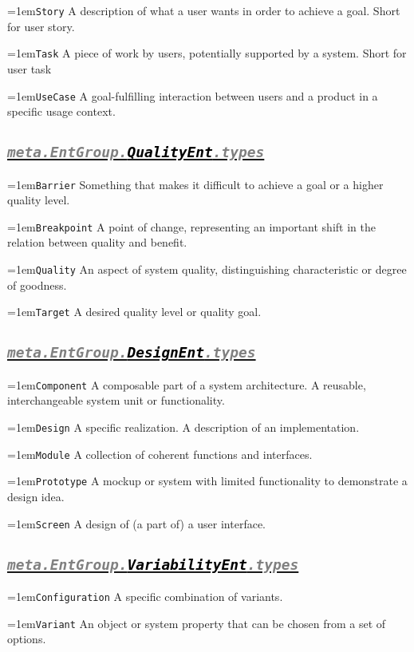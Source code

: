 \documentclass[a4paper,oneside]{article}
\newcommand\Concept[2]{\hangindent=1em\lstinline+#1+ #2}
\begin{document}
\begin{multicols*}{4}
\Concept{Story}{A description of what a user wants in order to achieve a goal. Short for user story.}

\Concept{Task}{A piece of work by users, potentially supported by a system. Short for user task}

\Concept{UseCase}{A goal-fulfilling interaction between users and a product in a specific usage context.}


\subsection*{\underline{\texttt{\textit{{\textcolor{gray}{meta.EntGroup.}\textcolor{black}{QualityEnt}}\textcolor{gray}{.types}}}}}
\Concept{Barrier}{Something that makes it difficult to achieve a goal or a higher quality level.}

\Concept{Breakpoint}{A point of change, representing an important shift in the relation between quality and benefit.}

\Concept{Quality}{An aspect of system quality, distinguishing characteristic or degree of goodness.}

\Concept{Target}{A desired quality level or quality goal.}


\subsection*{\underline{\texttt{\textit{{\textcolor{gray}{meta.EntGroup.}\textcolor{black}{DesignEnt}}\textcolor{gray}{.types}}}}}
\Concept{Component}{A composable part of a system architecture. A reusable, interchangeable system unit or functionality.}

\Concept{Design}{A specific realization. A description of an implementation.}

\Concept{Module}{A collection of coherent functions and interfaces.}

\Concept{Prototype}{A mockup or system with limited functionality to demonstrate a design idea.}

\Concept{Screen}{A design of (a part of) a user interface.}


\subsection*{\underline{\texttt{\textit{{\textcolor{gray}{meta.EntGroup.}\textcolor{black}{VariabilityEnt}}\textcolor{gray}{.types}}}}}
\Concept{Configuration}{A specific combination of variants.}

\Concept{Variant}{An object or system property that can be chosen from a set of options.}


\end{multicols*}
\end{document}
